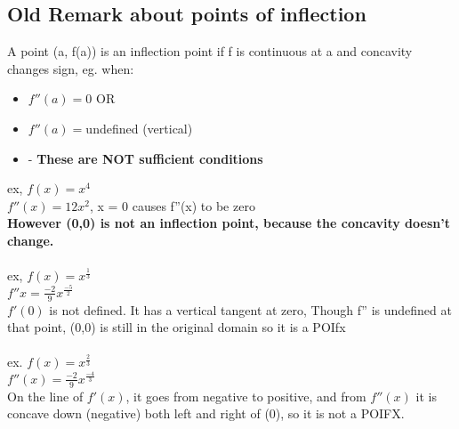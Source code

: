 \documentclass[twocolumn, 12pt]{report}
\begin{document}
   \subsection{Old Remark about points of inflection}
   A point (a, f(a)) is an inflection point if f is continuous at a and concavity changes sign, eg. when:
   \begin{itemize}
     \item $f''(a) = 0$ OR
     \item $f''(a) = $undefined (vertical)
     \item - \textbf{These are NOT sufficient conditions}
   \end{itemize}
   ex, $f(x) = x^4$\\
   $f''(x) = 12x^2$, x = 0 causes f''(x) to be zero \\
   \textbf{However (0,0) is not an inflection point, because the concavity doesn't change.} \\\\
   ex, $f(x) = x^\frac{1}{3}$\\$f''x = \frac{-2}{9}x^\frac{-5}{2}$\\$f'(0)$ is not defined. It has a vertical tangent at zero, Though f'' is undefined at that point, (0,0) is still in the original domain so it is a POIfx \\\\
   ex. $f(x) = x^\frac{2}{3}$\\ $f''(x) = \frac{-2}{9}x^\frac{-4}{3}$ \\ On the line of $f'(x)$, it goes from negative to positive, and from $f''(x)$ it is concave down (negative) both left and right of (0), so it is not a POIFX.
\end{document}
